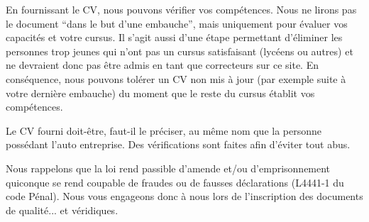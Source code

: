 ﻿En fournissant le CV, nous pouvons vérifier vos compétences.
Nous ne lirons pas le document “dans le but d'une embauche”, mais uniquement pour évaluer vos capacités et votre cursus. Il s'agit aussi d'une étape permettant d'éliminer les personnes trop jeunes qui n'ont pas un cursus satisfaisant (lycéens ou autres) et ne devraient donc pas être admis en tant que correcteurs sur ce site.
En conséquence, nous pouvons tolérer un CV non mis à jour (par exemple suite à votre dernière embauche) du moment que le reste du cursus établit vos compétences.

Le CV fourni doit-être, faut-il le préciser, au même nom que la personne possédant l'auto entreprise. Des vérifications sont faites afin d'éviter tout abus.

Nous rappelons que la loi rend passible d'amende et/ou d'emprisonnement quiconque se rend coupable de fraudes ou de fausses déclarations (L4441-1 du code Pénal). Nous vous engageons donc à nous lors de l'inscription des documents de qualité... et véridiques.
